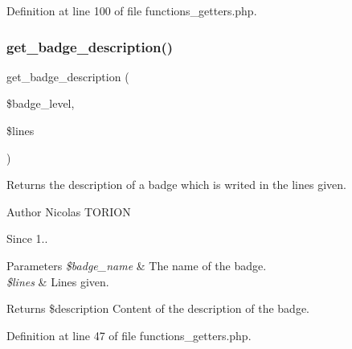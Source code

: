 Definition at line 100 of file functions\+\_\+getters.\+php.

\mbox{\label{functions__getters_8php_a57e8cb3d87ff5e56ed6d41016b176a57}} 
\subsubsection{\texorpdfstring{get\+\_\+badge\+\_\+description()}{get\_badge\_description()}}
{\footnotesize\ttfamily get\+\_\+badge\+\_\+description (\begin{DoxyParamCaption}\item[{}]{\$badge\+\_\+level,  }\item[{}]{\$lines }\end{DoxyParamCaption})}

Returns the description of a badge which is writed in the lines given.

\begin{DoxyAuthor}{Author}
Nicolas T\+O\+R\+I\+ON 
\end{DoxyAuthor}
\begin{DoxySince}{Since}
1.. 
\end{DoxySince}

\begin{DoxyParams}{Parameters}
{\em \$badge\+\_\+name} & The name of the badge. \\
\hline
{\em \$lines} & Lines given. \\
\hline
\end{DoxyParams}
\begin{DoxyReturn}{Returns}
\$description Content of the description of the badge. 
\end{DoxyReturn}


Definition at line 47 of file functions\+\_\+getters.\+php.

\mbox{\label{functions__getters_8php_a7b98f284ce9eccf0745bac524b852d20}} 
